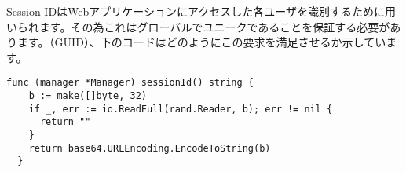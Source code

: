 Session IDはWebアプリケーションにアクセスした各ユーザを識別するために用いられます。その為これはグローバルでユニークであることを保証する必要があります。（GUID）、下のコードはどのようにこの要求を満足させるか示しています。

\begin{lstlisting}[numbers=none]
  func (manager *Manager) sessionId() string {
    b := make([]byte, 32)
    if _, err := io.ReadFull(rand.Reader, b); err != nil {
      return ""
    }
    return base64.URLEncoding.EncodeToString(b)
  }
\end{lstlisting}
